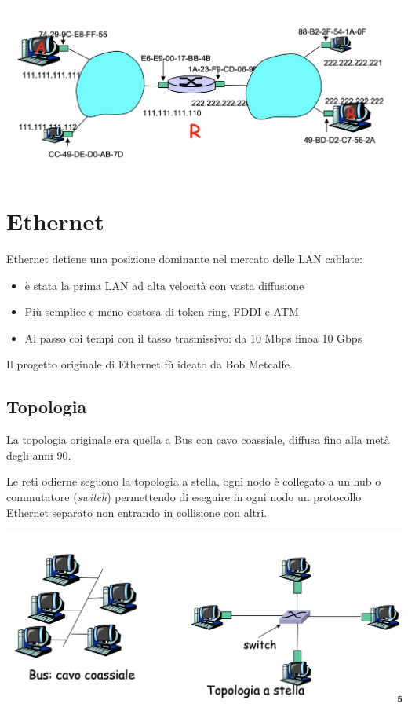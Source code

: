 \documentclass{report}
\begin{document}
\begin{center}
		\includegraphics[width=0.7\linewidth]{arp2}
	\end{center}

\hypertarget{header-n135}{%
\section{Ethernet}\label{header-n135}}

Ethernet detiene una posizione dominante nel mercato delle LAN cablate:

\begin{itemize}
\item
  è stata la prima LAN ad alta velocità con vasta diffusione
\item
  Più semplice e meno costosa di token ring, FDDI e ATM
\item
  Al passo coi tempi con il tasso trasmissivo: da 10 Mbps finoa 10 Gbps
\end{itemize}

Il progetto originale di Ethernet fù ideato da Bob Metcalfe.

\hypertarget{header-n145}{%
\subsection{Topologia}\label{header-n145}}

La topologia originale era quella a Bus con cavo coassiale, diffusa fino
alla metà degli anni 90.

Le reti odierne seguono la topologia a stella, ogni nodo è collegato a
un hub o commutatore (\emph{switch}) permettendo di eseguire in ogni
nodo un protocollo Ethernet separato non entrando in collisione con
altri.

\begin{center}
		\includegraphics[width=0.7\linewidth]{topologie}
	\end{center}
\end{document}
